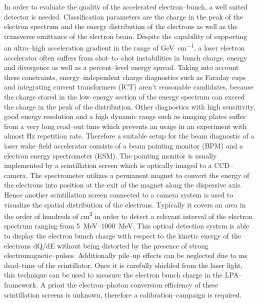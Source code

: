 \documentclass[%
preprint,
amsmath,
amssymb,
aip,
rsi, 
numerical,
floatfix,
]{revtex4-1}
\newcommand{\myCite}[1]{\textcolor{blue}{\cite{#1}}}
\begin{document}
In order to evaluate the quality of the accelerated electron--bunch, a well suited detector is needed. 
Classification parameters are the charge in the peak of the electron spectrum and the energy distribution of the electrons as well as the transverse emittance of the electron beam. 
Despite the capability of supporting an ultra--high acceleration gradient in the range of \si{\giga\electronvolt\per\centi\metre}, a laser electron accelerator often suffers from shot--to--shot instabilities in bunch charge, energy and divergence as well as a percent--level energy spread. 
Taking into account these constraints, energy--independent charge diagnostics such as Faraday cups and integrating current transformers (ICT) aren't reasonable candidates, because the charge stored in the low--energy section of the energy spectrum can exceed the charge in the peak of the distribution. 
Other diagnostics with high sensitivity, good energy resolution and a high dynamic range such as imaging plates\myCite{Tanaka2005,Masuda2008,Zeil2010,Bonnet2013} suffer from a very long read--out time which prevents an usage in an experiment with almost Hz repetition rate.
Therefore a suitable setup for the beam diagnostic of a laser wake--field accelerator consists of a beam pointing monitor (BPM) and a electron energy spectrometer (ESM). 
The pointing monitor is usually implemented by a scintillation screen which is optically imaged to a CCD--camera. 
The spectrometer utilizes a permanent magnet to convert the energy of the electrons into position at the exit of the magnet along the dispersive axis. 
Hence another scintillation screen connected to a camera system is used to visualize the spatial distribution of the electrons.
Typically it covers an area in the order of hundreds of \si{\centi\metre^2} in order to detect a relevant interval of the electron spectrum ranging from \SIrange{5}{1000}{\mega\electronvolt}. 
This optical detection system is able to display the electron bunch charge with respect to the kinetic energy of the electrons \si[per-mode=symbol]{dQ\per dE} without being distorted by the presence of strong electromagnetic--pulses. 
Additionally pile--up effects can be neglected due to \si{\milli\second} dead--time of the scintillator.
Once it is carefully shielded from the laser light, this technique can be used to measure the electron bunch charge in the LPA--framework. 
A priori the electron--photon conversion efficiency of these scintillation screens is unknown, therefore a calibration--campaign is required.
\end{document}
